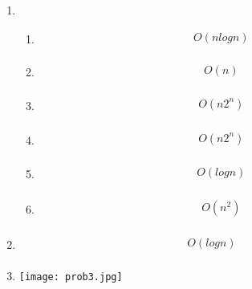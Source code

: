 \documentclass[11pt]{article}
\begin{document}
\begin{enumerate}[leftmargin=*]

    \item

    \begin{enumerate}
        \item
	\begin{align*}
           O(nlogn)\\
    	\end{align*}

        \item
	\begin{align*}
            O(n)\\
    	\end{align*}

        \item
	\begin{align*}
            O(n2^n)\\
    	\end{align*}

        \item
	\begin{align*}
            O(n2^n)\\
    	\end{align*}

        \item
	\begin{align*}
            O(logn)\\
    	\end{align*}

        \item
	\begin{align*}
            O(n^2)\\
    	\end{align*}
	\end{enumerate}
    \item {\it }
	\begin{align*}
        O(logn)\\
    	\end{align*}

    \item {\it }

	\texttt{[image: prob3.jpg]}


\end{enumerate}
\end{document}
